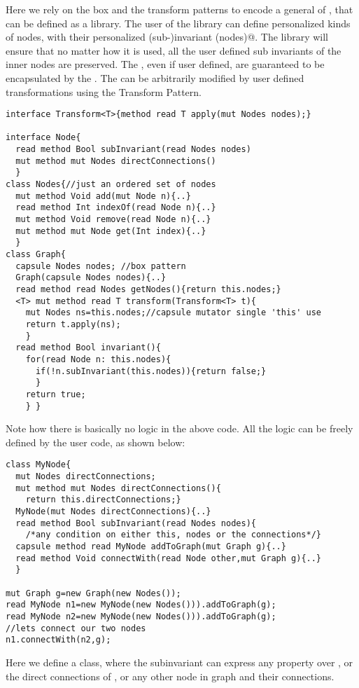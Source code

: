 


Here we rely on the box and the transform patterns to encode
a general \Q@Graph@
of \Q@Node@s, that can be defined as a library.
The user of the library can define personalized kinds of nodes,
with their personalized (sub-)invariant \Q@subInvariant(nodes)@.
The library will ensure that no matter how it is used, all the 
user defined sub invariants of the inner nodes are preserved.
The \Q@Node@s, even if user defined, are guaranteed to be encapsulated by the \Q@Graph@.
The \Q@Graph@ can be arbitrarily modified by user defined transformations using the Transform Pattern.
\begin{lstlisting}
interface Transform<T>{method read T apply(mut Nodes nodes);}

interface Node{
  read method Bool subInvariant(read Nodes nodes)
  mut method mut Nodes directConnections()
  }
class Nodes{//just an ordered set of nodes 
  mut method Void add(mut Node n){..}
  read method Int indexOf(read Node n){..}
  mut method Void remove(read Node n){..}
  mut method mut Node get(Int index){..}
  }
class Graph{ 
  capsule Nodes nodes; //box pattern
  Graph(capsule Nodes nodes){..}
  read method read Nodes getNodes(){return this.nodes;}
  <T> mut method read T transform(Transform<T> t){
    mut Nodes ns=this.nodes;//capsule mutator single 'this' use
    return t.apply(ns);
    }
  read method Bool invariant(){
    for(read Node n: this.nodes){
      if(!n.subInvariant(this.nodes)){return false;}
      }
    return true;
    } }
\end{lstlisting}
Note how there is basically no logic in the above code.
All the logic can be freely defined by the user code, as shown below:

\begin{lstlisting}
class MyNode{
  mut Nodes directConnections;
  mut method mut Nodes directConnections(){
    return this.directConnections;}
  MyNode(mut Nodes directConnections){..}
  read method Bool subInvariant(read Nodes nodes){
    /*any condition on either this, nodes or the connections*/}  
  capsule method read MyNode addToGraph(mut Graph g){..}
  read method Void connectWith(read Node other,mut Graph g){..}
  }

mut Graph g=new Graph(new Nodes());
read MyNode n1=new MyNode(new Nodes())).addToGraph(g);
read MyNode n2=new MyNode(new Nodes())).addToGraph(g);
//lets connect our two nodes
n1.connectWith(n2,g);
\end{lstlisting}
Here we define a \Q@MyNode@ class, where the subinvariant can express any property over \Q@this@, or the direct connections of \Q@this@, or any other node in graph and their connections.

